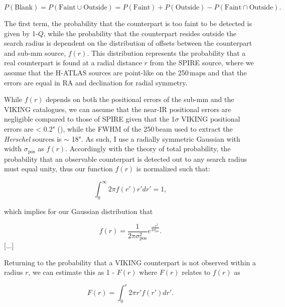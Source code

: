 \begin{equation}
    P(\textrm{Blank}) = P(\textrm{Faint} \cup \textrm{Outside}) = P(\textrm{Faint}) + P(\textrm{Outside}) - P(\textrm{Faint} \cap \textrm{Outside}).
\end{equation}

The first term, the probability that the counterpart is too faint to be detected is given by 1-$Q$, while the probability that the counterpart resides outside the search radius is dependent on the distribution of offsets between the counterpart and sub-mm source, $f(r)$. This distribution represents the probability that a real counterpart is found at a radial distance $r$ from the SPIRE source, where we assume that the H-ATLAS sources are point-like on the 250\,\micron maps and that the errors are equal in RA and declination for radial symmetry.

While $f(r)$ depends on both the positional errors of the sub-mm and the VIKING catalogues, we can assume that the near-IR positional errors are negligible compared to those of SPIRE given that the 1$\sigma$ VIKING positional errors are < 0.2" (\citealt{Fleuren_2012}), while the FWHM of the 250\,\micron beam used to extract the \textit{Herschel} sources is $\sim$ 18". As such, I use a radially symmetric Gaussian with width $\sigma_\textrm{pos}$ as $f(r)$. Accordingly with the theory of total probability, the probability that an observable counterpart is detected out to any search radius must equal unity, thus our function $f(r)$ is normalized such that:

\begin{equation}
    \int_0^\infty 2\pi f(r')r'dr' = 1,
\end{equation}

which implies for our Gaussian distribution that

\begin{equation}
    f(r) = \frac{1}{2\pi\sigma_\textrm{pos}^2}e^{\frac{-r^2}{2\sigma_\textrm{pos}^2}}.
\label{eq:positional_offset_distribution}
\end{equation}
[...]

Returning to the probability that a VIKING counterpart is not observed within a radius $r$, we can estimate this as 1 - $F(r)$ where $F(r)$ relates to $f(r)$ as

\begin{equation}
    F(r) = \int_0^r 2\pi r'f(r')dr'.
\end{equation}

